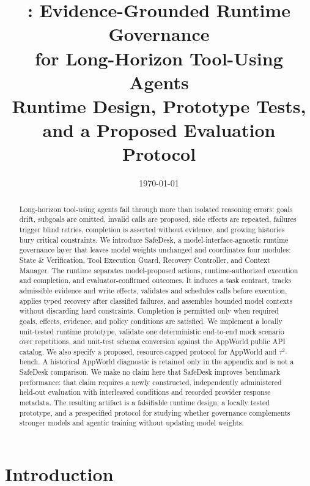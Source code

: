 \documentclass[10pt]{article}
\title{\safedesk: Evidence-Grounded Runtime Governance\\
for Long-Horizon Tool-Using Agents\\[0.45em]
\large Runtime Design, Prototype Tests, and a Proposed Evaluation Protocol}
\author{\PaperAuthors%
  \ifdefempty{\PaperAffiliation}{}{\\\small\PaperAffiliation}%
  \ifdefempty{\PaperEmail}{}{\\\small\texttt{\PaperEmail}}}
\date{\today}
\newcommand{\safedesk}{SafeDesk}
\begin{document}
\maketitle
{}

\begin{abstract}
Long-horizon tool-using agents fail through more than isolated reasoning errors:
goals drift, subgoals are omitted, invalid calls are proposed, side effects are
repeated, failures trigger blind retries, completion is asserted without evidence,
and growing histories bury critical constraints. We introduce \safedesk, a
model-interface-agnostic runtime governance layer that leaves model weights unchanged and
coordinates four modules: State \& Verification, Tool Execution Guard, Recovery
Controller, and Context Manager. The runtime separates model-proposed actions,
runtime-authorized execution and completion, and evaluator-confirmed outcomes.
It induces a task contract, tracks admissible evidence and write effects,
validates and schedules calls before execution, applies typed recovery after
classified failures, and assembles bounded model contexts without discarding hard
constraints. Completion is permitted only when required goals, effects, evidence,
and policy conditions are satisfied.
We implement a locally unit-tested runtime prototype, validate one deterministic
end-to-end mock scenario over \PrototypeValidationRepetitionCount{} repetitions,
and unit-test schema conversion against the AppWorld public API catalog. We also
specify a proposed, resource-capped protocol for AppWorld and $\tau^2$-bench. A
historical AppWorld diagnostic is retained only in
the appendix and is not a SafeDesk comparison. We make no claim here that
SafeDesk improves benchmark performance: that claim requires a newly constructed,
independently administered held-out evaluation with interleaved conditions and
recorded provider response metadata. The resulting artifact is a falsifiable
runtime design, a locally tested prototype, and a prespecified protocol for
studying whether governance complements stronger models and agentic training
without updating model weights.
\end{abstract}

\section{Introduction}
\end{document}
